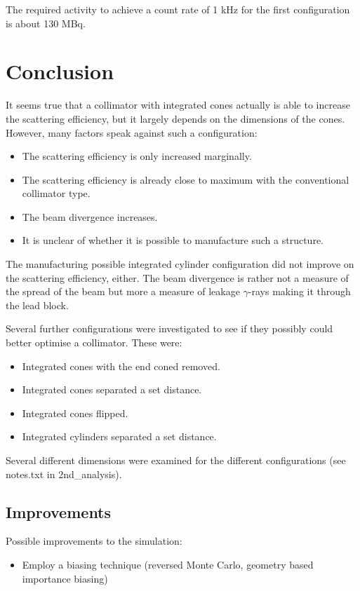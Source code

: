 \documentclass[a4paper]{article}
\begin{document}
The required activity to achieve a count rate of 1 kHz for the first configuration is about 130 MBq.


\section{Conclusion}
It seems true that a collimator with integrated cones actually is able to increase the scattering efficiency, but it largely depends on the dimensions of the cones. However, many factors speak against such a configuration:
\begin{itemize}
  \item The scattering efficiency is only increased marginally.
  \item The scattering efficiency is already close to maximum with the conventional collimator type.
  \item The beam divergence increases.
  \item It is unclear of whether it is possible to manufacture such a structure.
\end{itemize}
The manufacturing possible integrated cylinder configuration did not improve on the scattering efficiency, either.
The beam divergence is rather not a measure of the spread of the beam but more a measure of leakage $\gamma$-rays making it through the lead block.

Several further configurations were investigated to see if they possibly could better optimise a collimator. These were:
\begin{itemize}
  \item Integrated cones with the end coned removed.
  \item Integrated cones separated a set distance.
  \item Integrated cones flipped.
  \item Integrated cylinders separated a set distance.
\end{itemize}
Several different dimensions were examined for the different configurations (see notes.txt in 2nd\_analysis).

\subsection{Improvements}
Possible improvements to the simulation:
\begin{itemize}
  \item Employ a biasing technique (reversed Monte Carlo, geometry based importance biasing)
\end{itemize}
\end{document}
